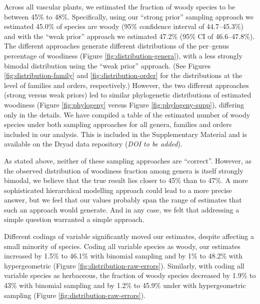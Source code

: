 \documentclass[a4paper,12pt]{article}
\begin{document}
Across all vascular plants, we estimated the fraction of woody species
to be between 45\% to 48\%.
Specifically, using our ``strong prior'' sampling approach we
estimated 45.0\% of species are woody (95\% confidence interval of
44.7--45.3\%) and with the ``weak prior'' approach we estimated 47.2\%
(95\% CI of 46.6--47.8\%).
%
The different approaches generate different distributions of the
per--genus percentage of woodiness (Figure
\ref{fig:distribution-genera}), with a less strongly bimodal
distribution using the ``weak prior'' approach. (See Figures
\ref{fig:distribution-family} and \ref{fig:distribution-order} 
for the distributions at the level of families and orders, respectively.) 
However, the two different approaches (strong
versus weak priors) led to similar phylogenetic distributions of
estimated woodiness (Figure \ref{fig:phylogeny} versus Figure
\ref{fig:phylogeny-supp}), differing only in the details. We have compiled
a table of the estimated number of woody species under both sampling
approaches for all genera, families and orders included in our analysis.
This is included in the Supplementary Material and is available on the 
Dryad data repository (\textit{DOI to be added}).

As stated above, neither of these sampling approaches are ``correct''. However,
as the observed distribution of woodiness fraction among genera is
itself strongly bimodal, we believe that the true result lies closer
to 45\% than to 47\%.  A more sophisticated hierarchical modelling
approach could lead to a more precise answer, but we feel that our
values probably span the range of estimates that such an approach
would generate. And in any case, we felt that addressing a simple question
warranted a simple approach.  

Different codings of variable  significantly moved our estimates,
despite affecting a small minority of species.  Coding all
variable species as woody, our estimates 
increased by 1.5\% to 46.1\% with binomial sampling 
and by 1\% to 48.2\% with hypergeometric (Figure
\ref{fig:distribution-raw-errors}). Similarly, with coding
all variable species as herbaceous, the fraction of woody species
decreased by 1.9\% to 43\% with binomial sampling
and by 1.2\% to 45.9\% under with hypergeometric sampling (Figure
\ref{fig:distribution-raw-errors}).
\end{document}
